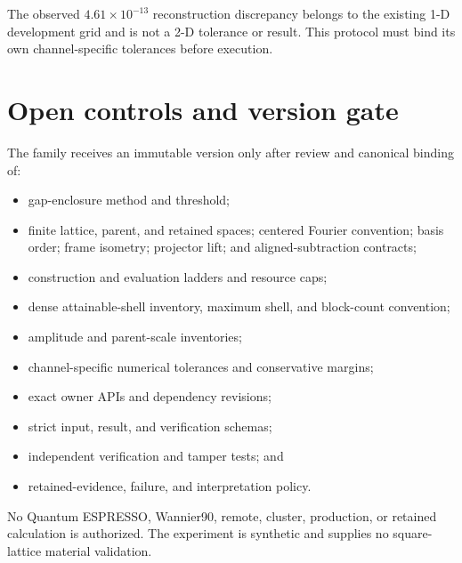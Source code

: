 \documentclass[11pt]{article}
\begin{document}
The observed $4.61\times10^{-13}$ reconstruction discrepancy belongs to the existing
1-D development grid and is not a 2-D tolerance or result. This protocol must bind its
own channel-specific tolerances before execution.

\section{Open controls and version gate}

The family receives an immutable version only after review and canonical binding of:

\begin{itemize}
 \item gap-enclosure method and threshold;
 \item finite lattice, parent, and retained spaces; centered Fourier convention; basis
       order; frame isometry; projector lift; and aligned-subtraction contracts;
 \item construction and evaluation ladders and resource caps;
 \item dense attainable-shell inventory, maximum shell, and block-count convention;
 \item amplitude and parent-scale inventories;
 \item channel-specific numerical tolerances and conservative margins;
 \item exact owner APIs and dependency revisions;
 \item strict input, result, and verification schemas;
 \item independent verification and tamper tests; and
 \item retained-evidence, failure, and interpretation policy.
\end{itemize}

No Quantum ESPRESSO, Wannier90, remote, cluster, production, or retained calculation is
authorized. The experiment is synthetic and supplies no square-lattice material
validation.



\end{document}
